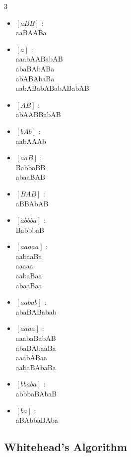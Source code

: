 \documentclass[11pt]{article}
\begin{document}
\begin{prop}
\begin{multicols}{3}
\begin{itemize}
\item $[aBB]$ : \\
aaBAABa

\item $[a]$ : \\
aaabAABabAB\\
abaBAbABa\\
abABAbaBa\\
aabABabABabABabAB

\item $[AB]$ : \\
abAABBabAB

\item $[bAb]$ : \\
aabAAAb

\item $[aaB]$ : \\
BabbaBB\\
abaaBAB

\item $[BAB]$ : \\
aBBAbAB

\item $[abbba]$ : \\
BabbbaB

\item $[aaaaa]$ : \\
aabaaBa\\
aaaaa \\
aabaBaa \\
abaaBaa

\item $[aabab]$ : \\
abaBABabab

\item $[aaaa]$ : \\
aaabaBabAB\\
abaBAbaaBa\\
aaabABaa\\
aabaBAbaBa

\item $[bbaba]$ : \\
abbbaBAbaB

\item $[ba]$ : \\
aBAbbaBAba
\end{itemize}
\end{multicols}
\end{prop}

\subsection*{Whitehead's Algorithm}
\end{document}
